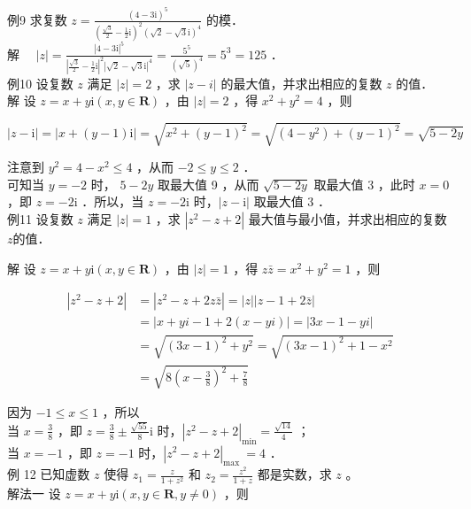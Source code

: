 \documentclass[10pt]{article}
\begin{document}
例9 求复数 \(z=\frac{(4-3 \mathrm{i})^{5}}{\left(\frac{\sqrt{3}}{2}-\frac{1}{2} \mathrm{i}\right)^{2}(\sqrt{2}-\sqrt{3} \mathrm{i})^{4}}\) 的模．\\
解 \(\quad|z|=\frac{|4-3 \mathrm{i}|^{5}}{\left|\frac{\sqrt{3}}{2}-\frac{1}{2} \mathrm{i}\right|^{2}|\sqrt{2}-\sqrt{3} \mathrm{i}|^{4}}=\frac{5^{5}}{(\sqrt{5})^{4}}=5^{3}=125\) ．\\
例10 设复数 \(z\) 满足 \(|z|=2\) ，求 \(|z-i|\) 的最大值，并求出相应的复数 \(z\) 的值．\\
解 设 \(z=x+y \mathrm{i}(x, y \in \mathbf{R})\) ，由 \(|z|=2\) ，得 \(x^{2}+y^{2}=4\) ，则

\[
|z-\mathrm{i}|=|x+(y-1) \mathrm{i}|=\sqrt{x^{2}+(y-1)^{2}}=\sqrt{\left(4-y^{2}\right)+(y-1)^{2}}=\sqrt{5-2 y}
\]

注意到 \(y^{2}=4-x^{2} \leqslant 4\) ，从而 \(-2 \leqslant y \leqslant 2\) ．\\
可知当 \(y=-2\) 时， \(5-2 y\) 取最大值 9 ，从而 \(\sqrt{5-2 y}\) 取最大值 3 ，此时 \(x=0\) ，即 \(z=-2 \mathrm{i}\) ．所以，当 \(z=-2 \mathrm{i}\) 时，\(|z-\mathrm{i}|\) 取最大值 3 ．\\
例11 设复数 \(z\) 满足 \(|z|=1\) ，求 \(\left|z^{2}-z+2\right|\) 最大值与最小值，并求出相应的复数 \(z\)的值．

解 设 \(z=x+y \mathrm{i}(x, y \in \mathbf{R})\) ，由 \(|z|=1\) ，得 \(z \bar{z}=x^{2}+y^{2}=1\) ，则

\[
\begin{aligned}
\left|z^{2}-z+2\right| & =\left|z^{2}-z+2 z \bar{z}\right|=|z||z-1+2 \bar{z}| \\
& =|x+y i-1+2(x-y i)|=|3 x-1-y i| \\
& =\sqrt{(3 x-1)^{2}+y^{2}}=\sqrt{(3 x-1)^{2}+1-x^{2}} \\
& =\sqrt{8\left(x-\frac{3}{8}\right)^{2}+\frac{7}{8}}
\end{aligned}
\]

因为 \(-1 \leqslant x \leqslant 1\) ，所以\\
当 \(x=\frac{3}{8}\) ，即 \(z=\frac{3}{8} \pm \frac{\sqrt{55}}{8} \mathrm{i}\) 时，\(\left|z^{2}-z+2\right|_{\min }=\frac{\sqrt{14}}{4}\) ；\\
当 \(x=-1\) ，即 \(z=-1\) 时，\(\left|z^{2}-z+2\right|_{\text {max }}=4\) ．\\
例 12 已知虚数 \(z\) 使得 \(z_{1}=\frac{z}{1+z^{2}}\) 和 \(z_{2}=\frac{z^{2}}{1+z}\) 都是实数，求 \(z\) 。\\
解法一 设 \(z=x+y \mathrm{i}(x, y \in \mathbf{R}, y \neq 0)\) ，则
\end{document}
